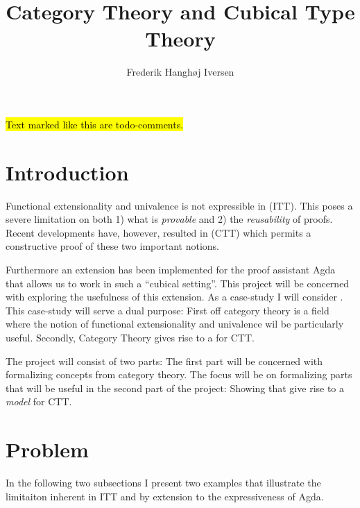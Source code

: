 \documentclass{article}
\title{Category Theory and Cubical Type Theory}
\author{Frederik Hanghøj Iversen}
\newcommand{\sectiondescription}[1]{\iffalse #1\fi}
\newcommand{\mycomment}[1]{\hl{#1}}
\begin{document}
\maketitle
%
\mycomment{Text marked like this are todo-comments.}
\sectiondescription{Text marked like this describe what should go in the section.}
%
\section{Introduction}
%
\sectiondescription{%
Briefly describe and motivate the project, and convince the reader of the
importance of the proposed thesis work. A good introduction will answer these
questions: Why is addressing these challenges significant for gaining new
knowledge in the studied domain? How and where can this new knowledge be
applied?
}
%
Functional extensionality and univalence is not expressible in
 (ITT). This poses a severe limitation
on both 1) what is \emph{provable} and 2) the \emph{reusability} of proofs.
Recent developments have, however, resulted in  (CTT)
which permits a constructive proof of these two important notions.

Furthermore an extension has been implemented for the proof assistant Agda that
allows us to work in such a ``cubical setting''. This project will be concerned
with exploring the usefulness of this extension. As a case-study I will consider
. This case-study will serve a dual purpose: First off
category theory is a field where the notion of functional extensionality and
univalence wil be particularly useful. Secondly, Category Theory gives rise to
a  for CTT.

The project will consist of two parts: The first part will be concerned with
formalizing concepts from category theory. The focus will be on formalizing
parts that will be useful in the second part of the project: Showing that
 give rise to a \emph{model} for CTT.
%
\section{Problem}
%
\sectiondescription{%
This section is optional. It may be used if there is a need to describe the
problem that you want to solve in more technical detail and if this problem
description is too extensive to fit in the introduction.
}
%
In the following two subsections I present two examples that illustrate the
limitaiton inherent in ITT and by extension to the expressiveness of Agda.
%
\end{document}
